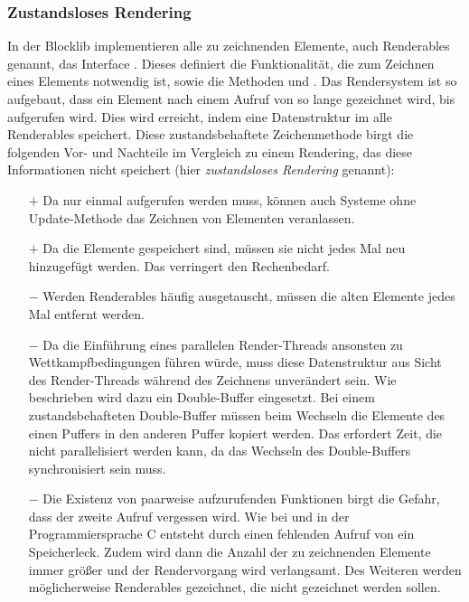 \subsubsection{Zustandsloses Rendering}\label{sec:statelessRendering}
In der Blocklib implementieren alle zu zeichnenden Elemente, auch Renderables genannt, das Interface \classRenderable{}. Dieses definiert die Funktionalität, die zum Zeichnen eines Elements notwendig ist, sowie die Methoden  und . Das Rendersystem ist so aufgebaut, dass ein Element nach einem Aufruf von  so lange gezeichnet wird, bis  aufgerufen wird. Dies wird erreicht, indem eine Datenstruktur im \classMasterRenderer{} alle Renderables speichert. Diese zustandsbehaftete Zeichenmethode birgt die folgenden Vor- und Nachteile im Vergleich zu einem Rendering, das diese Informationen nicht speichert (hier \emph{zustandsloses Rendering} genannt):

\begin{itemize}
	\item[$+$] Da  nur einmal aufgerufen werden muss, können auch Systeme ohne Update-Methode das Zeichnen von Elementen veranlassen.
	\item[$+$] Da die Elemente gespeichert sind, müssen sie nicht jedes Mal neu hinzugefügt werden. Das verringert den Rechenbedarf.
	\item[$-$] Werden Renderables häufig ausgetauscht, müssen die alten Elemente jedes Mal entfernt werden.
	\item[$-$] Da die Einführung eines parallelen Render-Threads ansonsten zu Wettkampfbedingungen führen würde, muss diese Datenstruktur aus Sicht des Render-Threads während des Zeichnens unverändert sein. Wie beschrieben wird dazu ein Double-Buffer eingesetzt. Bei einem zustandsbehafteten Double-Buffer müssen beim Wechseln die Elemente des einen Puffers in den anderen Puffer kopiert werden. Das erfordert Zeit, die nicht parallelisiert werden kann, da das Wechseln des Double-Buffers synchronisiert sein muss.
	\item[$-$] Die Existenz von paarweise aufzurufenden Funktionen birgt die Gefahr, dass der zweite Aufruf vergessen wird. Wie bei  und  in der Programmiersprache C entsteht durch einen fehlenden Aufruf von  ein Speicherleck. Zudem wird dann die Anzahl der zu zeichnenden Elemente immer größer und der Rendervorgang wird verlangsamt. Des Weiteren werden möglicherweise Renderables gezeichnet, die nicht gezeichnet werden sollen.
\end{itemize}

